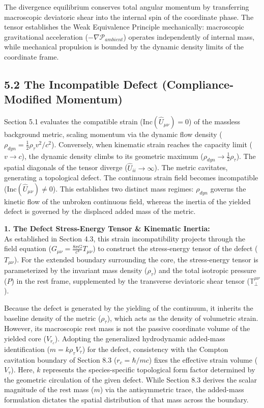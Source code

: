 The divergence equilibrium conserves total angular momentum by transferring macroscopic deviatoric shear into the internal spin of the coordinate phase. The tensor establishes the Weak Equivalence Principle mechanically: macroscopic gravitational acceleration ($-\nabla \mathcal{P}_{ambient}$) operates independently of internal mass, while mechanical propulsion is bounded by the dynamic density limits of the coordinate frame.


\subsection*{5.2 The Incompatible Defect (Compliance-Modified Momentum)}

Section 5.1 evaluates the compatible strain ($\text{Inc}(\hat{U}_{\mu\nu}) = 0$) of the massless background metric, scaling momentum via the dynamic flow density ($\rho_{dyn} = \frac{1}{2}\rho_\tau v^2/c^2$). Conversely, when kinematic strain reaches the capacity limit ($v \to c$), the dynamic density climbs to its geometric maximum ($\rho_{dyn} \to \frac{1}{2}\rho_\tau$). The spatial diagonals of the tensor diverge ($\hat{U}_{ii} \to \infty$). The metric cavitates, generating a topological defect. The continuous strain field becomes incompatible ($\text{Inc}(\hat{U}_{\mu\nu}) \neq 0$). This establishes two distinct mass regimes: $\rho_{dyn}$ governs the kinetic flow of the unbroken continuous field, whereas the inertia of the yielded defect is governed by the displaced added mass of the metric. 
\vspace{0.2 cm}

\textbf{1. The Defect Stress-Energy Tensor \& Kinematic Inertia:} \\
As established in Section 4.3, this strain incompatibility projects through the field equation ($G_{\mu\nu} = \frac{8\pi G}{c^4} T_{\mu\nu}$) to construct the stress-energy tensor of the defect ($T_{\mu\nu}$). For the extended boundary surrounding the core, the stress-energy tensor is parameterized by the invariant mass density ($\rho_\tau$) and the total isotropic pressure ($P$) in the rest frame, supplemented by the transverse deviatoric shear tensor ($\mathbb{T}_{\perp}^{\mu\nu}$). 

Because the defect is generated by the yielding of the continuum, it inherits the baseline density of the metric ($\rho_\tau$), which acts as the density of volumetric strain. However, its macroscopic rest mass is not the passive coordinate volume of the yielded core ($V_{r_c}$). Adopting the generalized hydrodynamic added-mass identification ($m = k \rho_\tau V_\tau$) for the defect, consistency with the Compton cavitation boundary of Section 8.3 ($r_c = \hbar/mc$) fixes the effective strain volume ($V_\tau$). Here, $k$ represents the species-specific topological form factor determined by the geometric circulation of the given defect. While Section 8.3 derives the scalar magnitude of the rest mass ($m$) via the antisymmetric trace, the added-mass formulation dictates the spatial distribution of that mass across the boundary. 

